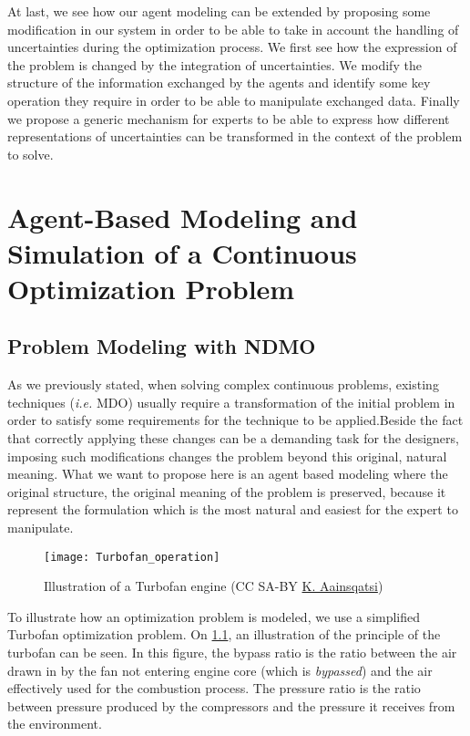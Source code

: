 At last, we see how our agent modeling can be extended by proposing some modification in our system in order to be able to take in account the handling of uncertainties during the optimization process. We first see how the expression of the problem is changed by the integration of uncertainties. We modify the structure of the information exchanged by the agents and identify some key operation they require in order to be able to manipulate exchanged data. Finally we propose a generic mechanism for experts to be able to express how different representations of uncertainties can be transformed in the context of the problem to solve.

\chapter{Agent-Based Modeling and Simulation of a Continuous Optimization Problem}

\section{Problem Modeling with NDMO}\label{modeling}

As we previously stated, when solving complex continuous problems, existing techniques (\emph{i.e.} MDO) usually require a transformation of the initial problem in order to satisfy some requirements for the technique to be applied.Beside the fact that correctly applying these changes can be a demanding task for the designers, imposing such modifications changes the problem beyond this original, natural meaning. What we want to propose here is  an agent based modeling where the original structure, the original meaning of the problem is preserved, because it represent the formulation which is the most natural and easiest for the expert to manipulate.

\begin{figure}[]
	\centering
	\texttt{[image: Turbofan\_operation]}
	\caption{Illustration of a Turbofan engine (CC SA-BY  \href{http://en.wikipedia.org/wiki/File:Turbofan_operation.svg}{K. Aainsqatsi})}
	\label{turbofan_illu}
\end{figure}

To illustrate how an optimization problem is modeled, we use a simplified Turbofan optimization problem. On \figurename{} \ref{turbofan_illu}, an illustration of the principle of the turbofan can be seen. In this figure, the bypass ratio is the ratio between the air drawn in by the fan not entering engine core (which is \emph{bypassed}) and the air effectively used for the combustion process. The pressure ratio is the ratio between pressure produced by the compressors and the pressure it receives from the environment.

